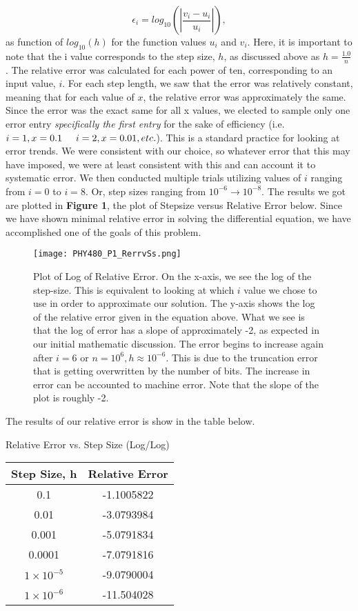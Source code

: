 \documentclass{article}
\begin{document}
\[
\epsilon_i=log_{10}\left(\left|\frac{v_i-u_i}
{u_i}\right|\right),
\]
as function of $log_{10}(h)$ for the function values $u_i$ and $v_i$. Here, it is important to note that the i value corresponds to the step size, $h$, as discussed above as $h = \frac{1.0}{n}$. The relative error was calculated for each power of ten, corresponding to an input value, $i$.
For each step length, we saw that the error was relatively constant, meaning that for each value of $x$, the relative error was approximately the same. Since the error was the exact same for all x values, we elected to sample only one error entry \textit{ specifically the first entry} for the sake of efficiency (i.e. $i=1, x= 0.1 \hspace{0.5cm} i=2, x = 0.01, etc.$). This is a standard practice for looking at error trends. We were consistent with our choice, so whatever error that this may have imposed, we were at least consistent with this and can account it to systematic error. We then conducted multiple trials utilizing values of $i$ ranging from $i=0$ to $i=8$. Or, step sizes ranging from $10^{-6} \rightarrow 10^{-8}$. The results we got are plotted in \textbf{Figure 1}, the plot of Stepsize versus Relative Error below. Since we have shown minimal relative error in solving the differential equation, we have accomplished one of the goals of this problem.

\begin{figure}[h!]
	\centering
	\texttt{[image: PHY480\_P1\_RerrvSs.png]}
	\caption{Plot of Log of Relative Error. On the x-axis, we see the log of the step-size. This is equivalent to looking at which $i$ value we chose to use in order to approximate our solution. The y-axis shows the log of the relative error given in the equation above. What we see is that the log of error has a slope of approximately -2, as expected in our initial mathematic discussion. The error begins to increase again after $i=6$ or $n=10^{6}, h \approx 10^{-6}$. This is due to the truncation error that is getting overwritten by the number of bits. The increase in error can be accounted to machine error. Note that the slope of the plot is roughly -2.}
	\label{fig:errorplot}
\end{figure}

The results of our relative error is show in the table below.

\begin{center}
	Relative Error vs. Step Size (Log/Log)\\
	\begin{tabular}{|c|c|}
		\hline
		Step Size, h & Relative Error\\
		\hline
		0.1 & -1.1005822\\
		\hline
		0.01 & -3.0793984\\
		\hline
		0.001 & -5.0791834\\
		\hline
		0.0001 & -7.0791816\\
		\hline
		$1\times10^{-5}$ & -9.0790004 \\
		\hline
		$1\times10^{-6}$ & -11.504028\\
		\hline
	\end{tabular}
\end{center}
\end{document}
